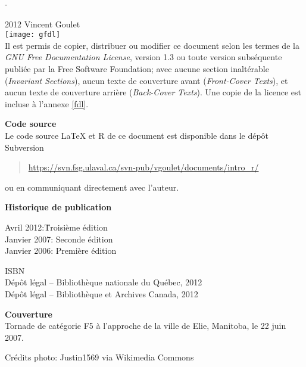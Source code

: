 \begingroup
\calccentering{\unitlength}
\begin{adjustwidth*}{\unitlength}{-\unitlength}
  \setlength{\parindent}{0pt}
  \setlength{\parskip}{\baselineskip}

  {\textcopyright} 2012 Vincent Goulet \\

  \texttt{[image: gfdl]}\\%
  Il est permis de copier, distribuer ou modifier ce document selon
  les termes de la \emph{GNU Free Documentation License}, version 1.3
  ou toute version subséquente publiée par la Free Software
  Foundation; avec aucune section inaltérable (\emph{Invariant
    Sections}), aucun texte de couverture avant (\emph{Front-Cover
    Texts}), et aucun texte de couverture arrière (\emph{Back-Cover
    Texts}). Une copie de la licence est incluse à l'annexe
  \ref{fdl}.

  \textbf{Code source} \\
  Le code source {\LaTeX} et R de ce document est disponible dans le
  dépôt Subversion
  \begin{quote}
    \sloppy
    \url{https://svn.fsg.ulaval.ca/svn-pub/vgoulet/documents/intro_r/}
  \end{quote}
  ou en communiquant directement avec l'auteur.

  \textbf{Historique de publication} \\
  \begin{tabbing}
    Avril 2012:\quad    \= Troisième édition \\
    Janvier 2007:       \> Seconde édition \\
    Janvier 2006:       \> Première édition \\
  \end{tabbing}

  ISBN \ISBN \\
  Dépôt légal -- Bibliothèque nationale du Québec, 2012 \\
  Dépôt légal -- Bibliothèque et Archives Canada, 2012

  \textbf{Couverture} \\
  Tornade de catégorie F5 à l'approche de la ville de Elie, Manitoba,
  le 22 juin 2007.

  Crédits photo: Justin1569 via Wikimedia Commons \\
\end{adjustwidth*}
\endgroup

